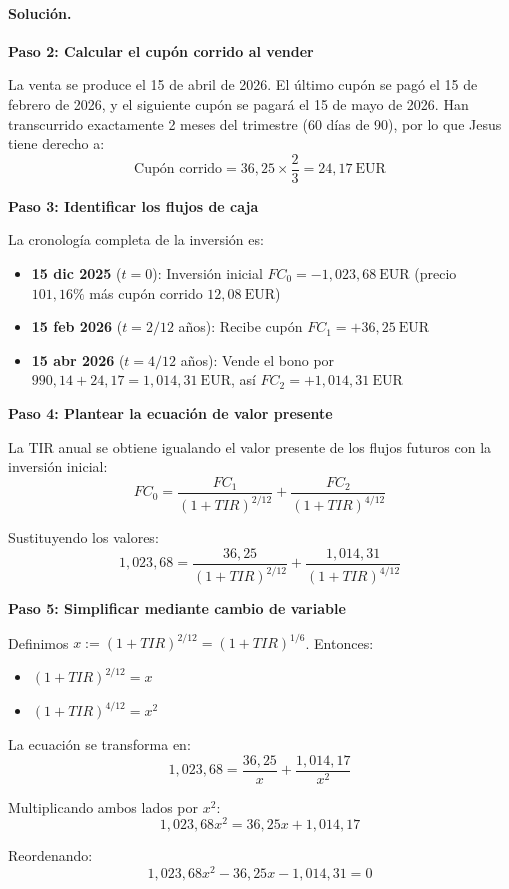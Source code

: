 \documentclass[12pt,a4paper]{article}
\newcommand{\EUR}[1]{\ensuremath{#1~\text{EUR}}}
\newenvironment{solucion}{\paragraph{Solución.}}{}
\begin{document}
\begin{solucion}
\begin{enumerate}[label=\alph*)]
  \textbf{Paso 2: Calcular el cupón corrido al vender}
  
  La venta se produce el 15 de abril de 2026. El último cupón se pagó el 15 de febrero de 2026, y el siguiente cupón se pagará el 15 de mayo de 2026. Han transcurrido exactamente 2 meses del trimestre (60 días de 90), por lo que Jesus tiene derecho a:
  \[
  \text{Cupón corrido} = 36{,}25 \times \frac{2}{3} = \EUR{24{,}17}
  \]
  
  \textbf{Paso 3: Identificar los flujos de caja}
  
  La cronología completa de la inversión es:
  \begin{itemize}
    \item \textbf{15 dic 2025} (\(t=0\)): Inversión inicial \(FC_0 = -\EUR{1{,}023{,}68}\) (precio \(101{,}16\%\) más cupón corrido \EUR{12{,}08})
    \item \textbf{15 feb 2026} (\(t=2/12\) años): Recibe cupón \(FC_1 = +\EUR{36{,}25}\)
    \item \textbf{15 abr 2026} (\(t=4/12\) años): Vende el bono por \(990{,}14 + 24{,}17 = \EUR{1{,}014{,}31}\), así \(FC_2 = +\EUR{1{,}014{,}31}\)
  \end{itemize}
  
  \textbf{Paso 4: Plantear la ecuación de valor presente}
  
  La TIR anual se obtiene igualando el valor presente de los flujos futuros con la inversión inicial:
  \[
  FC_0 = \frac{FC_1}{(1+TIR)^{2/12}} + \frac{FC_2}{(1+TIR)^{4/12}}
  \]
  
  Sustituyendo los valores:
  \[
  1{,}023{,}68 = \frac{36{,}25}{(1+TIR)^{2/12}} + \frac{1{,}014{,}31}{(1+TIR)^{4/12}}
  \]
  
  \textbf{Paso 5: Simplificar mediante cambio de variable}
  
  Definimos \(x := (1+TIR)^{2/12} = (1+TIR)^{1/6}\). Entonces:
  \begin{itemize}
    \item \((1+TIR)^{2/12} = x\)
    \item \((1+TIR)^{4/12} = x^2\)
  \end{itemize}
  
  La ecuación se transforma en:
  \[
  1{,}023{,}68 = \frac{36{,}25}{x} + \frac{1{,}014{,}17}{x^2}
  \]
  
  Multiplicando ambos lados por \(x^2\):
  \[
  1{,}023{,}68 x^2 = 36{,}25 x + 1{,}014{,}17
  \]
  
  Reordenando:
  \[
  1{,}023{,}68 x^2 - 36{,}25 x - 1{,}014{,}31 = 0
  \]
  

\end{enumerate}
\end{solucion}
\end{document}
